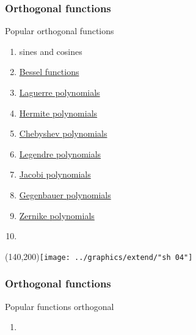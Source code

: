 \documentclass[handout]{beamer}
\begin{document}
\begin{frame}      %
\frametitle{Orthogonal functions}
  Popular orthogonal functions
  \begin{enumerate}
    \item sines and cosines
    \item \href{http://mathworld.wolfram.com/BesselFunction.html}{Bessel functions}
    \item \href{http://mathworld.wolfram.com/LaguerrePolynomial.html}{Laguerre polynomials}
    \item \href{http://mathworld.wolfram.com/HermitePolynomial.html}{Hermite polynomials}
    \item \href{http://mathworld.wolfram.com/ChebyshevPolynomialoftheFirstKind.html}{Chebyshev polynomials}
    \item \href{http://mathworld.wolfram.com/LegendrePolynomial.html}{Legendre polynomials}
    \item \href{http://mathworld.wolfram.com/JacobiPolynomial.html}{Jacobi polynomials}
    \item \href{http://mathworld.wolfram.com/GegenbauerPolynomial.html}{Gegenbauer polynomials}
    \item \href{http://mathworld.wolfram.com/ZernikePolynomial.html}{Zernike polynomials}
    \item \href{http://mathworld.wolfram.com/SphericalHarmonic.html}{}
  \end{enumerate}
    \Put(140,200){\texttt{[image: ../graphics/extend/"sh 04"]}}
\end{frame}

\begin{frame}      %
\frametitle{Orthogonal functions}
  Popular functions orthogonal 
  \begin{enumerate}
    \item {}
  \end{enumerate}
\end{frame}
\end{document}
